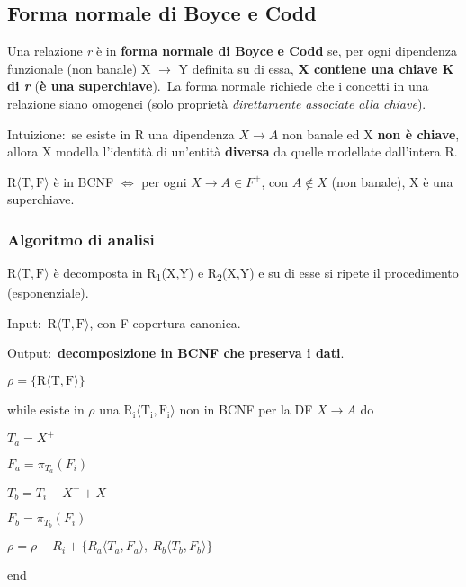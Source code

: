 \subsection{Forma normale di Boyce e Codd}

Una relazione \textit{r} è in \textbf{forma normale di Boyce e Codd} se, per ogni dipendenza funzionale (non banale) X $\rightarrow$ Y definita su di essa, \textbf{X contiene una chiave K di \textit{r}} (\textbf{è una superchiave}).\
La forma normale richiede che i concetti in una relazione siano omogenei (solo proprietà \textit{direttamente associate alla chiave}).\

Intuizione:\ se esiste in R una dipendenza $X \rightarrow A$ non banale ed X \textbf{non è chiave}, allora X modella l'identità di un'entità \textbf{diversa} da quelle modellate dall'intera R.

\begin{theorem}
	$\mathrm{R\langle T,F \rangle}$ è in BCNF $\Leftrightarrow$ per ogni $X \rightarrow A \in F^+$, con $A \not\in X$ (non banale), X è una superchiave.
\end{theorem}

\subsubsection{Algoritmo di analisi}

$\mathrm{R\langle T,F \rangle}$ è decomposta in R\textsubscript{1}(X,Y) e R\textsubscript{2}(X,Y) e su di esse si ripete il procedimento (esponenziale).\

\begin{flushleft}
	Input:\ $\mathrm{R\langle T,F \rangle}$, con F copertura canonica.

	Output:\ \textbf{decomposizione in BCNF che preserva i dati}.
\end{flushleft}

\begin{flushleft}

	$\rho = \{\mathrm{R\langle T,F \rangle}\}$

	while esiste in $\rho$ una $\mathrm{R_i\langle T_i,F_i \rangle}$ non in BCNF per la DF $X \rightarrow A$ do

	\quad $T_a = X^+$

	\quad $F_a = \pi_{T_a}(F_i)$

	\quad $T_b = T_i - X^+ + X$

	\quad $F_b = \pi_{T_b}(F_i)$

	\quad $\rho = \rho - R_i + \{R_a\langle T_a,F_a \rangle,\ R_b \langle T_b,F_b \rangle\}$

	end

\end{flushleft}


